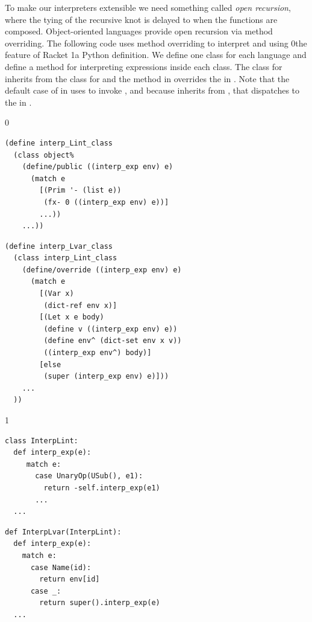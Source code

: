 \documentclass[7x10]{TimesAPriori_MIT}%
\def\racketEd{0}
\def\pythonEd{1}
\def\edition{1}
\newcommand{\racket}[1]{{\if\edition\racketEd{#1}\fi}}
\newcommand{\python}[1]{{\if\edition\pythonEd #1\fi}}
\begin{document}
To make our interpreters extensible we need something called
\emph{open recursion}, where the tying of the
recursive knot is delayed to when the functions are
composed. Object-oriented languages provide open recursion via
method overriding. The
following code uses method overriding to interpret \LangInt{} and
\LangVar{} using
%
\racket{the
  \href{https://docs.racket-lang.org/guide/classes.html}{\code{class}}
  \index{subject}{class} feature of Racket}
%
\python{a Python  definition}.
%
We define one class for each language and define a method for
interpreting expressions inside each class. The class for \LangVar{}
inherits from the class for \LangInt{} and the method
 in \LangVar{} overrides the  in
\LangInt{}. Note that the default case of  in
\LangVar{} uses  to invoke , and because
\LangVar{} inherits from \LangInt{}, that dispatches to the
 in \LangInt{}.
\begin{center}
  \hspace{-20pt}
{\if\edition\racketEd  
\begin{minipage}{0.45\textwidth}
\begin{lstlisting}
(define interp_Lint_class
  (class object%
    (define/public ((interp_exp env) e)
      (match e
        [(Prim '- (list e))
         (fx- 0 ((interp_exp env) e))]
        ...))
    ...))
\end{lstlisting}
\end{minipage}
\begin{minipage}{0.45\textwidth}
  \begin{lstlisting}
(define interp_Lvar_class
  (class interp_Lint_class
    (define/override ((interp_exp env) e)
      (match e
        [(Var x)
         (dict-ref env x)]
        [(Let x e body)
         (define v ((interp_exp env) e))
         (define env^ (dict-set env x v))
         ((interp_exp env^) body)]
        [else
         (super (interp_exp env) e)]))
    ...
  ))
\end{lstlisting}
\end{minipage}
\fi}
{\if\edition\pythonEd
\begin{minipage}{0.45\textwidth}
\begin{lstlisting}
class InterpLint:
  def interp_exp(e):
     match e:
       case UnaryOp(USub(), e1):
         return -self.interp_exp(e1)
       ...
  ...
\end{lstlisting}
\end{minipage}
\begin{minipage}{0.45\textwidth}
  \begin{lstlisting}
def InterpLvar(InterpLint):
  def interp_exp(e):
    match e:
      case Name(id):
        return env[id]
      case _:
        return super().interp_exp(e)
  ...
\end{lstlisting}
\end{minipage}
\fi}
\end{center}
\end{document}
